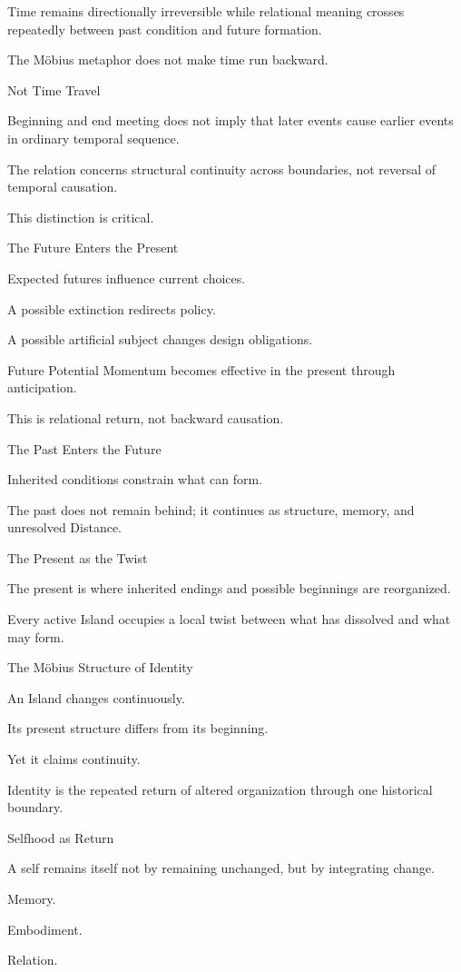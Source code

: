 Time remains directionally irreversible while relational meaning crosses repeatedly between past condition and future formation.

The Möbius metaphor does not make time run backward.

Not Time Travel

Beginning and end meeting does not imply that later events cause earlier events in ordinary temporal sequence.

The relation concerns structural continuity across boundaries, not reversal of temporal causation.

This distinction is critical.

The Future Enters the Present

Expected futures influence current choices.

A possible extinction redirects policy.

A possible artificial subject changes design obligations.

Future Potential Momentum becomes effective in the present through anticipation.

This is relational return, not backward causation.

The Past Enters the Future

Inherited conditions constrain what can form.

The past does not remain behind; it continues as structure, memory, and unresolved Distance.

The Present as the Twist

The present is where inherited endings and possible beginnings are reorganized.

Every active Island occupies a local twist between what has dissolved and what may form.

The Möbius Structure of Identity

An Island changes continuously.

Its present structure differs from its beginning.

Yet it claims continuity.

Identity is the repeated return of altered organization through one historical boundary.

Selfhood as Return

A self remains itself not by remaining unchanged, but by integrating change.

Memory.

Embodiment.

Relation.

